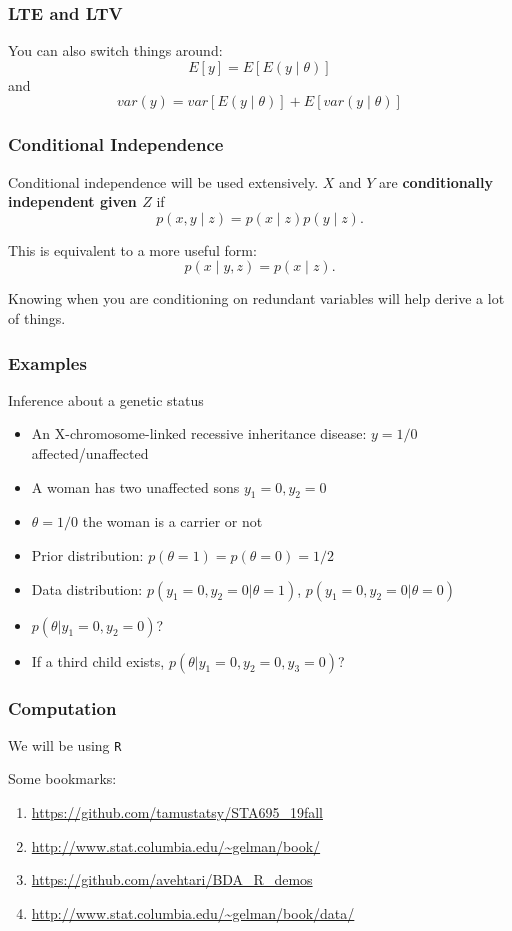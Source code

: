 \documentclass{beamer}
\begin{document}
\begin{frame}
\frametitle{LTE and LTV}

You can also switch things around:
\[
E[y] = E[E(y \mid \theta)]
\]
and
\[
var(y) = var[ E(y \mid \theta) ] + E[ var(y \mid \theta)]
\]
\end{frame}


\begin{frame}
\frametitle{Conditional Independence}

Conditional independence will be used extensively. $X$ and $Y$ are {\bf conditionally independent given $Z$} if $$
p(x,y \mid z) = p(x \mid z) p(y \mid z).
$$

This is equivalent to a more useful form:
$$
p(x \mid y, z) = p(x \mid z).
$$

Knowing when you are conditioning on redundant variables will help derive a lot of things.

\end{frame}


\begin{frame}
\frametitle{Examples}
Inference about a genetic status
\begin{itemize}
\item An X-chromosome-linked recessive inheritance disease: $y = 1/0$
  affected/unaffected
\item A woman has two unaffected sons $y_1 = 0, y_2 = 0$
\item $\theta = 1/0$ the woman is a carrier or not
\pause
\item Prior distribution: $p(\theta = 1) = p(\theta = 0) = 1/2$
\item Data distribution: $p(y_1 = 0, y_2 = 0|\theta = 1)$, $p(y_1 = 0,
  y_2 = 0|\theta = 0)$
\pause
\item $p(\theta|y_1 = 0, y_2 = 0)$?
\pause
\item If a third child exists, $p(\theta|y_1 = 0, y_2 = 0, y_3 = 0)$?
\end{itemize}
\end{frame}


\begin{frame}
\frametitle{Computation}

We will be using \texttt{R}
\newline


Some bookmarks:
\begin{enumerate}
\item \url{https://github.com/tamustatsy/STA695_19fall} 
\item \url{http://www.stat.columbia.edu/~gelman/book/}
\item \url{https://github.com/avehtari/BDA_R_demos}
\item \url{http://www.stat.columbia.edu/~gelman/book/data/}
\end{enumerate}



\end{frame}
\end{document}

